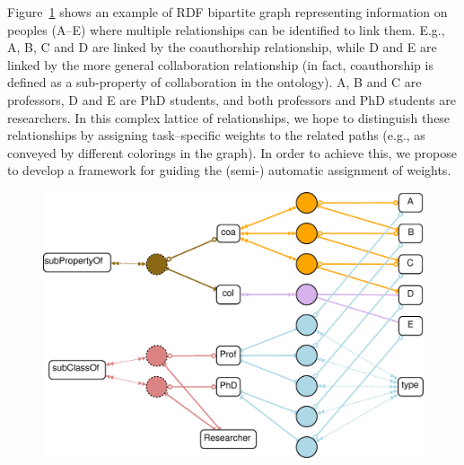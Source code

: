 \begin{myexp}
Figure~\ref{fig:hypergraph_mining-comp} shows an example of RDF bipartite graph representing information on peoples (A--E) where multiple relationships can be identified to link them. E.g., A, B, C and D are linked by the coauthorship relationship, while D and E are linked by the more general collaboration relationship (in fact, coauthorship is defined as a sub-property of collaboration in the ontology). A, B and C are professors, D and E are PhD students, and both professors and PhD students are researchers. In this complex lattice of relationships, we hope to distinguish these relationships by assigning task--specific weights to the related paths (e.g., as conveyed by different colorings in the graph). In order to achieve this, we propose to develop a framework for guiding the (semi-) automatic assignment of weights.
\end{myexp}

\begin{figure}[tbh]
\begin{center}
\includegraphics[width=.65\textwidth]{fig/hypergraph_mining-comp.eps}
\end{center}
\caption{\label{fig:hypergraph_mining-comp} }
\end{figure}
